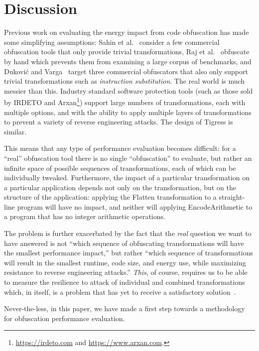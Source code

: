 
\section{Discussion}
\label{sec:discussion}
Previous work on evaluating the energy impact from code obfuscation has made some simplifying assumptions: Sahin et al.~\cite{6976079} consider a few commercial obfuscation tools that only provide trivial transformations, Raj et al.~\cite{raj2017modelling} obfuscate by hand which prevents them from examining a large corpus of benchmarks, and Dukovi\'{c} and Varga~\cite{dhukovic2015load} target three commercial obfuscators that also only support trivial transformations such as {\em instruction substitution}. The real world is much messier than this. Industry standard software protection tools (such as those sold by IRDETO and Arxan\footnote{\url{https://irdeto.com} and \url{https://www.arxan.com}.}) support large numbers of transformations, each with multiple options, and with the ability to apply multiple layers of transformations to prevent a variety of reverse engineering attacks. 
The design of Tigress is similar. 

This means that any type of performance evaluation becomes difficult: for a ``real'' obfuscation tool there is no single ``obfuscation'' to evaluate, but rather an infinite space of possible sequences of transformations, each of which can be individually tweaked. Furthermore, the impact of a particular transformation on a particular application depends not only on the transformation, but on the structure of the application: applying the Flatten transformation to a straight-line program will have no impact, and neither will applying EncodeArithmetic to a program that has no integer arithmetic operations.

The problem is further exacerbated by the fact that the {\em real} question we want to have answered is not ``which sequence of obfuscating transformations will have the smallest performance impact,'' but rather ``which sequence of transformations will result in the smallest runtime, code size, and energy use, while maximizing resistance to reverse engineering attacks.'' {\em This}, of course, requires us to be able to measure the resilience to attack of individual and combined transformations which, in itself, is a problem that has yet to receive a satisfactory solution~\cite{banescu2017characterizing}.

Never-the-less, in this paper, we have made a first step towards a methodology for obfuscation performance evaluation. 

